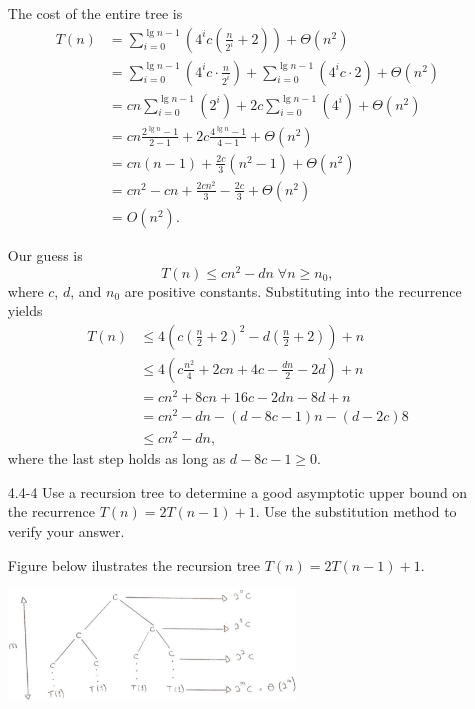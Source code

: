 \documentclass{report}
\makeatletter
\renewenvironment{framed}{%
 \def\FrameCommand##1{\hskip\@totalleftmargin
 \fboxsep=\FrameSep\fbox{##1}}%
 \MakeFramed {\advance\hsize-\width
   \@totalleftmargin\z@ \linewidth\hsize
   \@setminipage}}%
 {\par\unskip\endMakeFramed}
\DeclareMathOperator{\Forall}{\forall}
\makeatother
\begin{document}
\begin{enumerate}
\begin{framed}
The cost of the entire tree is
\begin{equation*}
\begin{aligned}
T(n) &= \sum_{i = 0}^{\lg n - 1} \left(4^i c \left(\frac{n}{2^i} + 2\right)\right) +
        \Theta(n^2)\\
     &= \sum_{i = 0}^{\lg n - 1} \left(4^i c \cdot \frac{n}{2^i}\right) +
        \sum_{i = 0}^{\lg n - 1} (4^i c \cdot 2) + \Theta(n^2)\\
     &= cn \sum_{i = 0}^{\lg n - 1} (2^i) + 2c \sum_{i = 0}^{\lg n - 1} (4^i) + \Theta(n^2)\\
     &= cn \frac{2^{\lg n} - 1}{2 - 1} + 2c \frac{4^{\lg n} - 1}{4 - 1} + \Theta(n^2)\\
     &= cn (n - 1) + \frac{2c}{3} (n^2 - 1) + \Theta(n^2)\\
     &= cn^2 - cn + \frac{2cn^2}{3} - \frac{2c}{3} + \Theta(n^2)\\
     &= O(n^2).
\end{aligned}
\end{equation*}

Our guess is
\[
T(n) \le c n^2 - dn \; \Forall n \ge n_0,
\]
where $c$, $d$, and $n_0$ are positive constants. Substituting into the
recurrence yields
\begin{equation*}
\begin{aligned}
  T(n) &\le 4 \left(c \left(\frac{n}{2} + 2\right)^2 - d\left(\frac{n}{2} + 2\right)\right) + n\\
       &\le 4 \left(c \frac{n^2}{4} + 2cn + 4c - \frac{dn}{2} - 2d\right) + n\\
       &= c n^2 + 8cn + 16c - 2dn - 8d + n\\
       &= c n^2 - dn - (d - 8c - 1)n - (d - 2c)8\\
       &\le c n^2 - dn,
\end{aligned}
\end{equation*}
where the last step holds as long as $d - 8c - 1 \ge 0$.
\end{framed}

\newpage

\item[4.4{-}4]{Use a recursion tree to determine a good asymptotic upper bound
on the recurrence $T(n) = 2T(n - 1) + 1$. Use the substitution method to verify
your answer.}

\begin{framed}
Figure below ilustrates the recursion tree $T(n) = 2T(n - 1) + 1$.

\begin{center}
\includegraphics[width=0.6\textwidth]{images/4_4_4_1.pdf}
\end{center}


\end{framed}
\end{enumerate}
\end{document}
